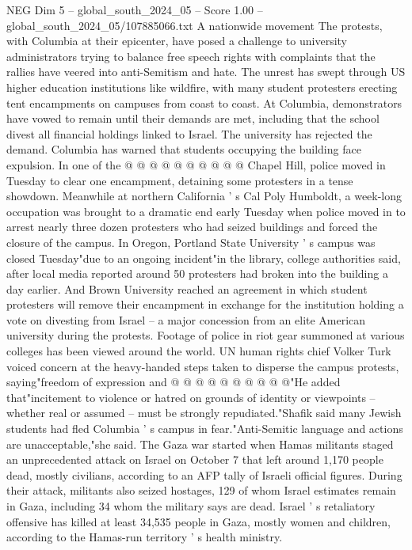 \begin{textsample}{NEG Dim 5 – global\_south\_2024\_05 – Score 1.00 – global\_south\_2024\_05/107885066.txt}
A nationwide movement The protests, with Columbia at their epicenter, have posed a challenge to university administrators trying to balance free speech rights with complaints that the rallies have veered into anti-Semitism and hate.
The unrest has swept through US higher education institutions like wildfire, with many student protesters erecting tent encampments on campuses from coast to coast.
At Columbia, demonstrators have vowed to remain until their demands are met, including that the school divest all financial holdings linked to Israel.
The university has rejected the demand.
Columbia has warned that students occupying the building face expulsion.
In one of the @ @ @ @ @ @ @ @ @ @ Chapel Hill, police moved in Tuesday to clear one encampment, detaining some protesters in a tense showdown.
Meanwhile at northern California ' s Cal Poly Humboldt, a week-long occupation was brought to a dramatic end early Tuesday when police moved in to arrest nearly three dozen protesters who had seized buildings and forced the closure of the campus.
In Oregon, Portland State University ' s campus was closed Tuesday"due to an ongoing incident"in the library, college authorities said, after local media reported around 50 protesters had broken into the building a day earlier.
And Brown University reached an agreement in which student protesters will remove their encampment in exchange for the institution holding a vote on divesting from Israel -- a major concession from an elite American university during the protests.
Footage of police in riot gear summoned at various colleges has been viewed around the world.
UN human rights chief Volker Turk voiced concern at the heavy-handed steps taken to disperse the campus protests, saying"freedom of expression and @ @ @ @ @ @ @ @ @ @"He added that"incitement to violence or hatred on grounds of identity or viewpoints -- whether real or assumed -- must be strongly repudiated."Shafik said many Jewish students had fled Columbia ' s campus in fear."Anti-Semitic language and actions are unacceptable,"she said.
The Gaza war started when Hamas militants staged an unprecedented attack on Israel on October 7 that left around 1,170 people dead, mostly civilians, according to an AFP tally of Israeli official figures.
During their attack, militants also seized hostages, 129 of whom Israel estimates remain in Gaza, including 34 whom the military says are dead.
Israel ' s retaliatory offensive has killed at least 34,535 people in Gaza, mostly women and children, according to the Hamas-run territory ' s health ministry.

\end{textsample}
